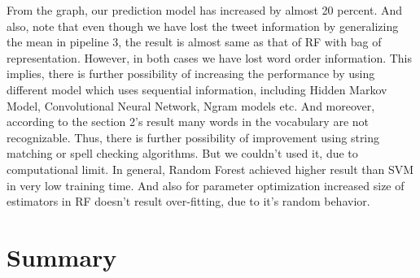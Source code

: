 \documentclass[10pt,conference,compsocconf]{IEEEtran}
\begin{document}
\begin{itemize}
From the graph, our prediction model has increased by almost 20 percent. And also, note that even though we have lost the tweet information by generalizing the mean in pipeline 3, the result is almost same as that of RF with bag of representation. However, in both cases we have lost word order information. This implies, there is further possibility of increasing the performance by using different model which uses sequential information, including Hidden Markov Model, Convolutional Neural Network, Ngram models etc. And moreover, according to the section 2's result many words in the vocabulary are not recognizable. Thus, there is further possibility of improvement using string matching or spell checking algorithms. But we couldn't used it, due to computational limit. In general, Random Forest achieved higher result than SVM in very low training time. And also for parameter optimization increased size of estimators in RF doesn't result over-fitting, due to it's random behavior. 
\end{itemize}

\section{Summary}
\label{S6}




\end{document}
